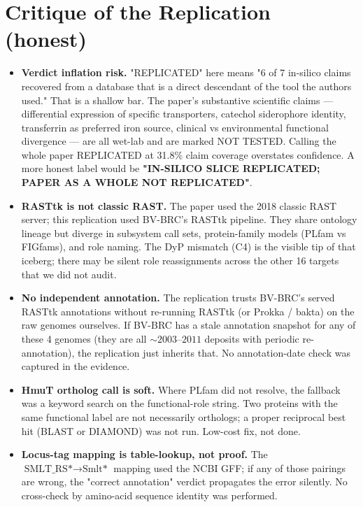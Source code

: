 \documentclass[10pt,a4paper]{article}
\begin{document}
\section{Critique of the Replication (honest)}
\begin{itemize}[leftmargin=1.4em,itemsep=3pt]
\item \textbf{Verdict inflation risk.} "REPLICATED" here means "6 of 7 in-silico
claims recovered from a database that is a direct descendant of the tool the
authors used." That is a shallow bar. The paper's substantive scientific claims
--- differential expression of specific transporters, catechol siderophore
identity, transferrin as preferred iron source, clinical vs environmental
functional divergence --- are all wet-lab and are marked NOT TESTED. Calling
the whole paper REPLICATED at 31.8\% claim coverage overstates confidence.
A more honest label would be \textbf{"IN-SILICO SLICE REPLICATED; PAPER AS A WHOLE
NOT REPLICATED"}.

\item \textbf{RASTtk is not classic RAST.} The paper used the 2018 classic RAST
server; this replication used BV-BRC's RASTtk pipeline. They share ontology
lineage but diverge in subsystem call sets, protein-family models (PLfam vs
FIGfams), and role naming. The DyP mismatch (C4) is the visible tip of that
iceberg; there may be silent role reassignments across the other 16 targets
that we did not audit.

\item \textbf{No independent annotation.} The replication trusts BV-BRC's
served RASTtk annotations without re-running RASTtk (or Prokka / bakta) on the
raw genomes ourselves. If BV-BRC has a stale annotation snapshot for any of
these 4 genomes (they are all $\sim 2003$--$2011$ deposits with periodic
re-annotation), the replication just inherits that. No annotation-date check
was captured in the evidence.

\item \textbf{HmuT ortholog call is soft.} Where PLfam did not resolve, the
fallback was a keyword search on the functional-role string. Two proteins with
the same functional label are not necessarily orthologs; a proper reciprocal
best hit (BLAST or DIAMOND) was not run. Low-cost fix, not done.

\item \textbf{Locus-tag mapping is table-lookup, not proof.} The
$\text{SMLT\_RS*} \rightarrow \text{Smlt*}$ mapping used the NCBI GFF; if any
of those pairings are wrong, the "correct annotation" verdict propagates the
error silently. No cross-check by amino-acid sequence identity was performed.


\end{itemize}
\end{document}
